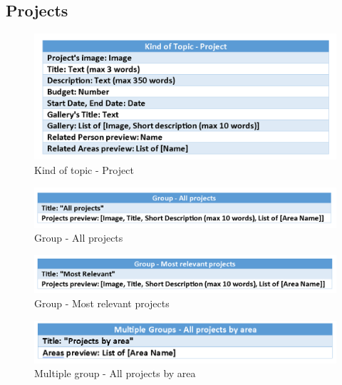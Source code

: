 \documentclass[11pt, letterpaper]{article}
\begin{document}
\subsection{Projects}
\begin{figure}[H]
    \centering
    \includegraphics[width=15cm]{images/Content_in_the_small/Kind_of_topic-Project.png}
    \caption{Kind of topic - Project}
    \label{fig:enter-label}
\end{figure}
\begin{figure}[H]
    \centering
    \includegraphics[width=15cm]{images/Content_in_the_small/Group-All_projects.png}
    \caption{Group - All projects}
    \label{fig:enter-label}
\end{figure}
\begin{figure}[H]
    \centering
    \includegraphics[width=15cm]{images/Content_in_the_small/Group-Most_relevant_projects.png}
    \caption{Group - Most relevant projects}
    \label{fig:enter-label}
\end{figure}
\begin{figure}[H]
    \centering
    \includegraphics[width=15cm]{images/Content_in_the_small/Mutiple_gruop-all_projects_by_area.png}
    \caption{Multiple group - All projects by area}
    \label{fig:enter-label}
\end{figure}
\end{document}
